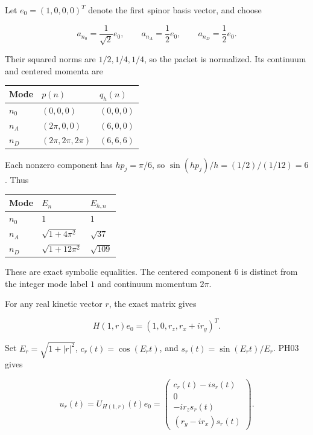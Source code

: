 Let \(e_0=(1,0,0,0)^T\) denote the first spinor basis vector, and choose

\[
a_{n_0}=\frac1{\sqrt2}e_0,\qquad
a_{n_A}=\frac12e_0,\qquad
a_{n_D}=\frac12e_0.
\]

Their squared norms are \(1/2,1/4,1/4\), so the packet is normalized.
Its continuum and centered momenta are

\begin{center}
\begin{tabular}{@{}lll@{}}
\toprule
Mode & \(p(n)\) & \(q_h(n)\) \\
\midrule

\(n_0\) & \((0,0,0)\) & \((0,0,0)\) \\
\(n_A\) & \((2\pi,0,0)\) & \((6,0,0)\) \\
\(n_D\) & \((2\pi,2\pi,2\pi)\) & \((6,6,6)\) \\
\bottomrule
\end{tabular}
\end{center}

Each nonzero component has \(hp_j=\pi/6\), so
\(\sin(hp_j)/h=(1/2)/(1/12)=6\). Thus

\begin{center}
\begin{tabular}{@{}lll@{}}
\toprule
Mode & \(E_n\) & \(E_{h,n}\) \\
\midrule

\(n_0\) & \(1\) & \(1\) \\
\(n_A\) & \(\sqrt{1+4\pi^2}\) & \(\sqrt{37}\) \\
\(n_D\) & \(\sqrt{1+12\pi^2}\) & \(\sqrt{109}\) \\
\bottomrule
\end{tabular}
\end{center}

These are exact symbolic equalities. The centered component \(6\) is
distinct from the integer mode label \(1\) and continuum momentum
\(2\pi\).

For any real kinetic vector \(r\), the exact matrix gives

\[
H(1,r)e_0=(1,0,r_z,r_x+ir_y)^T.
\]

Set \(E_r=\sqrt{1+|r|^2}\), \(c_r(t)=\cos(E_rt)\), and
\(s_r(t)=\sin(E_rt)/E_r\). PH03 gives

\[
u_r(t)=U_{H(1,r)}(t)e_0=
\begin{pmatrix}
c_r(t)-is_r(t)\\
0\\
-ir_zs_r(t)\\
(r_y-ir_x)s_r(t)
\end{pmatrix}.
\]

